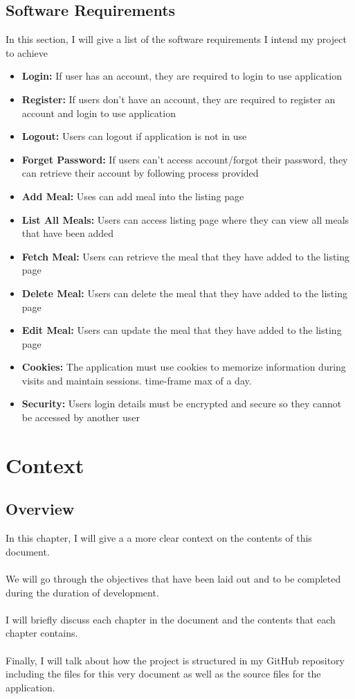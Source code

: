 \section{Software Requirements}

In this section, I will give a list of the software requirements I intend my project to achieve

\begin{itemize}
\item\textbf{Login: }If user has an account, they are required to login to use application
\item\textbf{Register: }If users don't have an account, they are required to register an account and login to use application
\item\textbf{Logout: }Users can logout if application is not in use
\item\textbf{Forget Password: }If users can't access account/forgot their password, they can retrieve their account by following process provided
\item\textbf{Add Meal: }Uses can add meal into the listing page
\item\textbf{List All Meals: }Users can access listing page where they can view all meals that have been added
\item\textbf{Fetch Meal: }Users can retrieve the meal that they have added to the listing page
\item\textbf{Delete Meal: }Users can delete the meal that they have added to the listing page
\item\textbf{Edit Meal: }Users can update the meal that they have added to the listing page
\item\textbf{Cookies: }The application must use cookies to memorize information during visits and maintain sessions.
time-frame max of a day.
\item\textbf{Security: }Users login details must be encrypted and secure so they cannot be accessed by another user
\end{itemize}

\chapter{Context}

\section{Overview}

In this chapter, I will give a a more clear context on the contents of this document.\\ \\
We will go through the objectives that have been laid out and to be completed during the duration of development.\\ \\
I will briefly discuss each chapter in the document and the contents that each chapter contains.\\ \\
Finally, I will talk about how the project is structured in my GitHub repository including the files for this very document as well as the source files for the application. 

